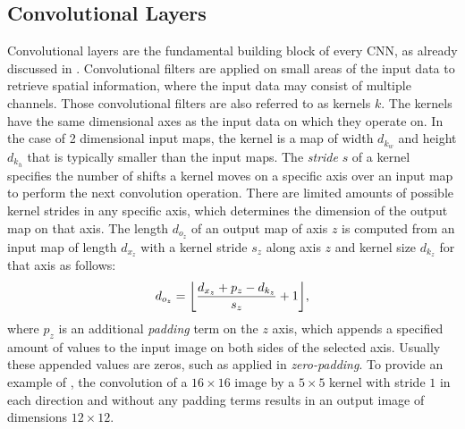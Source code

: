 
\subsection{Convolutional Layers}\label{sec:nn_theory_cnn}
Convolutional layers are the fundamental building block of every CNN, as already discussed in .
Convolutional filters are applied on small areas of the input data to retrieve spatial information, where the input data may consist of multiple channels.
Those convolutional filters are also referred to as kernels $k$.
The kernels have the same dimensional axes as the input data on which they operate on.
In the case of 2 dimensional input maps, the kernel is a map of width $d_{k_w}$ and height $d_{k_h}$ that is typically smaller than the input maps.
The \emph{stride} $s$ of a kernel specifies the number of shifts a kernel moves on a specific axis over an input map to perform the next convolution operation.
There are limited amounts of possible kernel strides in any specific axis, which determines the dimension of the output map on that axis.
The length $d_{o_z}$ of an output map of axis $z$ is computed from an input map of length $d_{x_z}$ with a kernel stride $s_z$ along axis $z$ and kernel size $d_{k_z}$ for that axis as follows:
\begin{equation}\label{eq:nn_theory_cnn_dim}
  d_{o_z} = \floor*{\frac{d_{x_z} + p_z - d_{k_z}}{s_z} + 1},
\end{equation}
where $p_z$ is an additional \emph{padding} term on the $z$ axis, which appends a specified amount of values to the input image on both sides of the selected axis.
Usually these appended values are zeros, such as applied in \emph{zero-padding}.
To provide an example of , the convolution of a $16 \times 16$ image by a $5 \times 5$ kernel with stride $1$ in each direction and without any padding terms results in an output image of dimensions $12 \times 12$.

